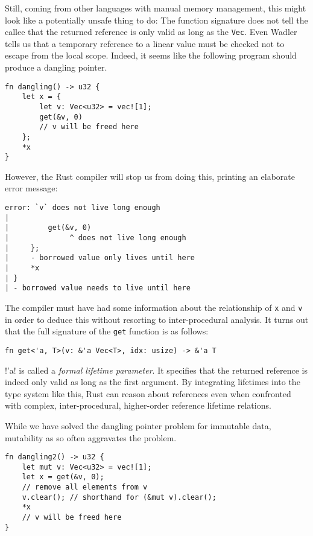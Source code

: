Still, coming from other languages with manual memory management, this might
look like a potentially unsafe thing to do: The function signature does not tell
the callee that the returned reference is only valid as long as the
\texttt{Vec}. Even Wadler tells us that a temporary reference to a linear value
must be checked not to escape from the local scope. Indeed, it seems like the following program should produce a dangling pointer.

\begin{verbatim}
fn dangling() -> u32 {
    let x = {
        let v: Vec<u32> = vec![1];
        get(&v, 0)
        // v will be freed here
    };
    *x
}
\end{verbatim}

However, the Rust compiler will stop us from doing this, printing an
elaborate error message:

\begin{verbatim}
error: `v` does not live long enough
|
|         get(&v, 0)
|              ^ does not live long enough
|     };
|     - borrowed value only lives until here
|     *x
| }
| - borrowed value needs to live until here
\end{verbatim}

The compiler must have had some information about the relationship of \texttt{x}
and \texttt{v} in order to deduce this without resorting to inter-procedural
analysis. It turns out that the full signature of the \texttt{get} function is as follows:

\begin{verbatim}
fn get<'a, T>(v: &'a Vec<T>, idx: usize) -> &'a T
\end{verbatim}

\rust!'a! is called a \emph{formal lifetime parameter}. It
specifies that the returned reference is indeed only valid as long as the first
argument. By integrating lifetimes into the type system like this, Rust can
reason about references even when confronted with complex, inter-procedural, higher-order reference lifetime relations.

While we have solved the dangling pointer problem for immutable data, mutability
as so often aggravates the problem.

\begin{verbatim}
fn dangling2() -> u32 {
    let mut v: Vec<u32> = vec![1];
    let x = get(&v, 0);
    // remove all elements from v
    v.clear(); // shorthand for (&mut v).clear();
    *x
    // v will be freed here
}
\end{verbatim}

